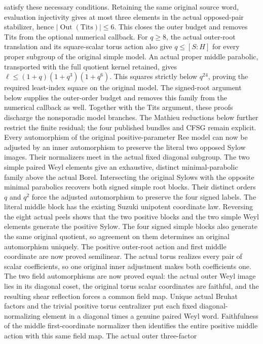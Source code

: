 satisfy these necessary conditions. Retaining the same original source
word, evaluation injectivity gives at most three elements in the actual
opposed-pair stabilizer, hence $|\operatorname{Out}(\mathrm{Tits})|\leq6$.
This closes the outer budget and removes Tits from the optional numerical
callback.
For $q\geq8$, the actual outer-root translation and its square-scalar
torus action also give $q\leq[S:H]$ for every proper subgroup of the
original simple model. An actual proper middle parabolic, transported
with the full quotient kernel retained, gives
$\ell\leq(1+q)(1+q^3)(1+q^6)$. This squares strictly below $q^{24}$,
proving the required least-index square on the original model.
The signed-root argument below supplies the outer-order budget and
removes this family from the numerical callback as well. Together with
the Tits argument, these proofs discharge the nonsporadic model branches.
The Mathieu reductions below further restrict the finite residual;
the four published bundles and CFSG remain explicit.
Every automorphism of the original positive-parameter Ree model can
now be adjusted by an inner automorphism to preserve the literal two
opposed Sylow images. Their normalizers meet in the actual fixed
diagonal subgroup. The two simple paired Weyl elements give an
exhaustive, distinct minimal-parabolic family above the actual Borel.
Intersecting the original Sylows with the opposite minimal parabolics
recovers both signed simple root blocks. Their distinct orders $q$ and
$q^2$ force the adjusted automorphism to preserve the four signed labels.
The literal middle block has the existing Suzuki unipotent coordinate
law. Reversing the eight actual peels shows that the two positive blocks
and the two simple Weyl elements generate the positive Sylow.
The four signed simple blocks also generate the same original quotient,
so agreement on them determines an original automorphism uniquely.
The positive outer-root action and first middle coordinate are now
proved semilinear. The actual torus realizes every pair of scalar
coefficients, so one original inner adjustment makes both coefficients
one. The two field automorphisms are now proved equal: the actual
outer Weyl image lies in its diagonal coset, the original torus scalar
coordinates are faithful, and the resulting shear reflection forces a
common field map. Unique actual Bruhat factors and the trivial
positive torus centralizer put each fixed diagonal-normalizing element
in a diagonal times a genuine paired Weyl word. Faithfulness of the
middle first-coordinate normalizer then identifies the entire positive
middle action with this same field map. The actual outer three-factor
